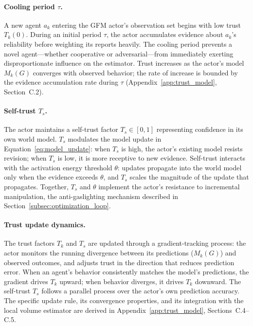 \paragraph{Cooling period $\tau$.} A new agent $a_k$ entering the GFM actor's
observation set begins with low trust $T_k(0)$. During an initial period
$\tau$, the actor accumulates evidence about $a_k$'s reliability before
weighting its reports heavily. The cooling period prevents a novel
agent---whether cooperative or adversarial---from immediately exerting
disproportionate influence on the estimator. Trust increases as the actor's
model $M_k(G)$ converges with observed behavior; the rate of increase is
bounded by the evidence accumulation rate during $\tau$
(Appendix~\ref{app:trust_model}, Section~C.2).

\paragraph{Self-trust $T_s$.} The actor maintains a self-trust factor $T_s \in
[0, 1]$ representing confidence in its own world model. $T_s$ modulates the
model update in Equation~\eqref{eq:model_update}: when $T_s$ is high, the
actor's existing model resists revision; when $T_s$ is low, it is more
receptive to new evidence. Self-trust interacts with the activation energy
threshold $\theta$: updates propagate into the world model only when the
evidence exceeds $\theta$, and $T_s$ scales the magnitude of the update that
propagates. Together, $T_s$ and $\theta$ implement the actor's resistance to
incremental manipulation, the anti-gaslighting mechanism described in
Section~\ref{subsec:optimization_loop}.

\paragraph{Trust update dynamics.} The trust factors $T_k$ and $T_s$ are
updated through a gradient-tracking process: the actor monitors the running
divergence between its predictions ($M_k(G)$) and observed outcomes, and
adjusts trust in the direction that reduces prediction error. When an agent's
behavior consistently matches the model's predictions, the gradient drives
$T_k$ upward; when behavior diverges, it drives $T_k$ downward. The self-trust
$T_s$ follows a parallel process over the actor's own prediction accuracy. The
specific update rule, its convergence properties, and its integration with the
local volume estimator are derived in Appendix~\ref{app:trust_model},
Sections~C.4--C.5.

